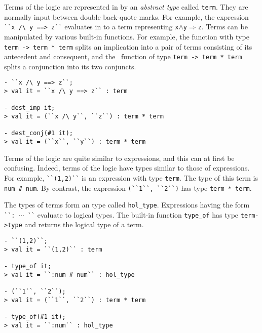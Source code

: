 Terms of the \HOL{} logic are represented in \ML{} by an {\it abstract
  type\/} called {\small\verb|term|}. They are normally input between
double back-quote marks.  For example, the expression
{\small\verb|``x /\ y ==> z``|} evaluates in \ML{} to a term representing
{\small\verb|x|}$\wedge${\small\verb|y|}$\Rightarrow${\small\verb|z|}.
Terms can be manipulated by various built-in \ML{} functions. For
example, the \ML{} function  with \ML{} type
{\small\verb|term -> term * term|} splits an implication into a pair
of terms consisting of its antecedent and consequent, and the \ML\
function  of type {\small\verb|term -> term * term|}
splits a conjunction into its two conjuncts.


\setcounter{sessioncount}{1}
\begin{session}
\begin{verbatim}
- ``x /\ y ==> z``;
> val it = ``x /\ y ==> z`` : term

- dest_imp it;
> val it = (``x /\ y``, ``z``) : term * term

- dest_conj(#1 it);
> val it = (``x``, ``y``) : term * term
\end{verbatim}
\end{session}

Terms of the \HOL{} logic are quite similar to \ML{} expressions, and
this can at first be confusing.  Indeed, terms of the logic have types
similar to those of \ML{} expressions.  For example,
{\small\verb|``(1,2)``|} is an \ML{} expression with \ML{} type
{\small\verb|term|}.  The \HOL{} type of this term is
{\small\verb|num # num|}.  By contrast, the \ML{} expression
{\small\verb|(``1``, ``2``)|} has type {\small\verb|term * term|}.

The types of \HOL{} terms form an \ML{} type called
{\small\verb|hol_type|}.  Expressions having the form
{\small\verb|``: |}$\cdots${\small\verb| ``|} evaluate to logical
types.  The built-in function {\small\verb|type_of|} has \ML{} type
{\small\verb|term->type|} and returns the logical type of a term.

\begin{session}
\begin{verbatim}
- ``(1,2)``;
> val it = ``(1,2)`` : term

- type_of it;
> val it = ``:num # num`` : hol_type

- (``1``, ``2``);
> val it = (``1``, ``2``) : term * term

- type_of(#1 it);
> val it = ``:num`` : hol_type
\end{verbatim}
\end{session}

